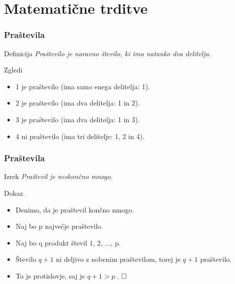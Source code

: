 \documentclass[11pt,hyperref={unicode}]{beamer}
\begin{document}
\section{Matematične trditve}
\begin{frame}
   \frametitle{Praštevila}
   \begin{block}{Definicija}
      \textit{Praštevilo je naravno število, ki ima natanko dva delitelja.}
   \end{block}

   \begin{exampleblock}{Zgledi}
      \begin{itemize} 
         \item 1 je praštevilo (ima samo enega delitelja: 1).
         \item 2 je praštevilo (ima dva delitelja: 1 in 2).
         \item 3 je praštevilo (ima dva delitelja: 1 in 3).
         \item 4 ni praštevilo (ima tri delitelje: 1, 2 in 4).
      \end{itemize}
   \end{exampleblock}
\end{frame}   
\begin{frame}
   \frametitle{Praštevila}
   \begin{block}{Izrek}
      \textit{Praštevil je neskončno mnogo.}
   \end{block}

   \begin{block}{Dokaz.}
      \begin{itemize} 
         \item Denimo, da je praštevil končno mnogo.
         \item Naj bo p največje praštevilo.
         \item Naj bo q produkt števil 1, 2, $ \dots $, p.
         \item Število $ q+1 $ ni deljivo z nobenim praštevilom, torej je 
         $ q + 1 $ praštevilo.
         \item To je protislovje, saj je $ q + 1 > p $ . $\hfill \square $ 
      \end{itemize}
   \end{block}
\end{frame}   
\end{document}
